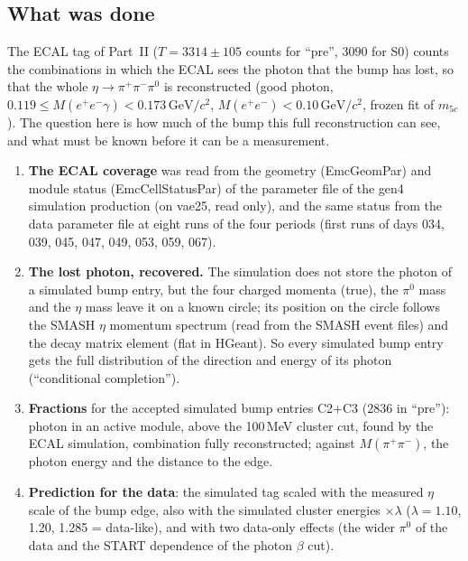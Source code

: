 \documentclass[11pt,a4paper]{article}
\newcommand{\piz}{\ensuremath{\pi^{0}}\xspace}
\newcommand{\ee}{\ensuremath{e^{+}e^{-}}\xspace}
\newcommand{\pipi}{\ensuremath{\pi^{+}\pi^{-}}\xspace}
\newcommand{\Mee}{\ensuremath{M(e^{+}e^{-})}\xspace}
\newcommand{\Mpipi}{\ensuremath{M(\pi^{+}\pi^{-})}\xspace}
\newcommand{\GeVcc}{\ensuremath{\mathrm{GeV}/c^{2}}\xspace}
\begin{document}
\subsection{What was done}
\label{sec:ecalacc-proc}
The ECAL tag of Part~II ($T=3314\pm105$ counts for ``pre'', $3090$ for S0) counts the combinations in which the ECAL sees the photon that the bump has lost,
so that the whole $\eta\to\pipi\piz$ is reconstructed (good photon, $0.119\le M(\ee\gamma)<0.173$\,\GeVcc, \Mee$<0.10$\,\GeVcc, frozen fit of
$m_{5c}$). The question here is how much of the bump this full reconstruction can see, and what must be known before it can be a measurement.
\begin{enumerate}\setlength{\itemsep}{1pt}
\item \textbf{The ECAL coverage} was read from the geometry (EmcGeomPar) and module status (EmcCellStatusPar) of the parameter file of the gen4
      simulation production (on vae25, read only), and the same status from the data parameter file at eight runs of the four periods (first runs of
      days 034, 039, 045, 047, 049, 053, 059, 067).
\item \textbf{The lost photon, recovered.} The simulation does not store the photon of a simulated bump entry, but the four charged momenta (true), the \piz
      mass and the $\eta$ mass leave it on a known circle; its position on the circle follows the SMASH $\eta$ momentum spectrum (read from the
      SMASH event files) and the decay matrix element (flat in HGeant). So every simulated bump entry gets the full distribution of the direction and
      energy of its photon (``conditional completion'').
\item \textbf{Fractions} for the accepted simulated bump entries C2+C3 (2836 in ``pre''): photon in an active module, above the 100\,MeV cluster cut,
      found by the ECAL simulation, combination fully reconstructed; against \Mpipi, the photon energy and the distance to the edge.
\item \textbf{Prediction for the data}: the simulated tag scaled with the measured $\eta$ scale of the bump edge, also with the simulated cluster
      energies $\times\lambda$ ($\lambda=1.10$, 1.20, 1.285 = data-like), and with two data-only effects (the wider \piz of the data and the START
      dependence of the photon $\beta$ cut).
\end{enumerate}
\end{document}
